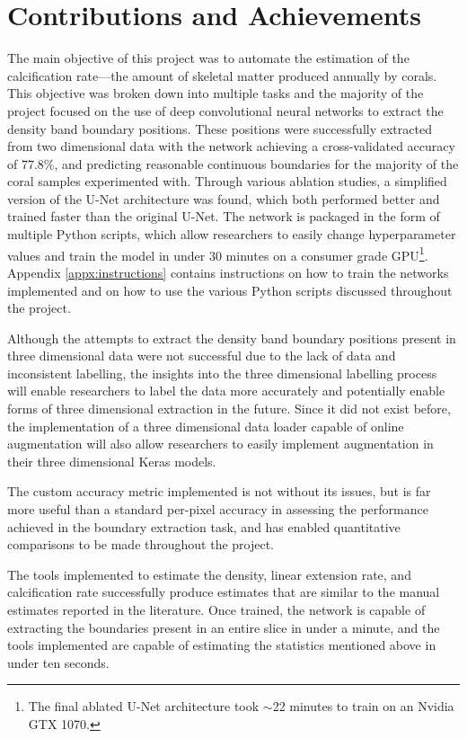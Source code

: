 \section{Contributions and Achievements}

The main objective of this project was to automate the estimation of the calcification rate---the amount of skeletal matter produced annually by corals. This objective was broken down into multiple tasks and the majority of the project focused on the use of deep convolutional neural networks to extract the density band boundary positions. These positions were successfully extracted from two dimensional data with the network achieving a cross-validated accuracy of 77.8\%, and predicting reasonable continuous boundaries for the majority of the coral samples experimented with. Through various ablation studies, a simplified version of the U-Net architecture was found, which both performed better and trained faster than the original U-Net. The network is packaged in the form of multiple Python scripts, which allow researchers to easily change hyperparameter values and train the model in under 30 minutes on a consumer grade GPU\footnote{The final ablated U-Net architecture took ${\sim}$22 minutes to train on an Nvidia GTX 1070.}. Appendix \ref{appx:instructions} contains instructions on how to train the networks implemented and on how to use the various Python scripts discussed throughout the project.

Although the attempts to extract the density band boundary positions present in three dimensional data were not successful due to the lack of data and inconsistent labelling, the insights into the three dimensional labelling process will enable researchers to label the data more accurately and potentially enable forms of three dimensional extraction in the future. Since it did not exist before, the implementation of a three dimensional data loader capable of online augmentation will also allow researchers to easily implement augmentation in their three dimensional Keras models.

The custom accuracy metric implemented is not without its issues, but is far more useful than a standard per-pixel accuracy in assessing the performance achieved in the boundary extraction task, and has enabled quantitative comparisons to be made throughout the project.

The tools implemented to estimate the density, linear extension rate, and calcification rate successfully produce estimates that are similar to the manual estimates reported in the literature. Once trained, the network is capable of extracting the boundaries present in an entire slice in under a minute, and the tools implemented are capable of estimating the statistics mentioned above in under ten seconds.

